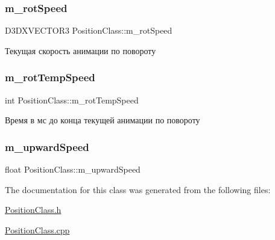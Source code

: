 \subsubsection{\texorpdfstring{m\+\_\+rot\+Speed}{m\_rotSpeed}}
{\footnotesize\ttfamily D3\+D\+X\+V\+E\+C\+T\+O\+R3 Position\+Class\+::m\+\_\+rot\+Speed\hspace{0.3cm}{\ttfamily [private]}}



Текущая скорость анимации по повороту 

\mbox{\label{class_position_class_a2b8254c12435937ad154bf730c7e2e6a}} 
\subsubsection{\texorpdfstring{m\+\_\+rot\+Temp\+Speed}{m\_rotTempSpeed}}
{\footnotesize\ttfamily int Position\+Class\+::m\+\_\+rot\+Temp\+Speed\hspace{0.3cm}{\ttfamily [private]}}



Время в мс до конца текущей анимации по повороту 

\mbox{\label{class_position_class_af0324bb22bef036aff2374066fdd6a3b}} 
\subsubsection{\texorpdfstring{m\+\_\+upward\+Speed}{m\_upwardSpeed}}
{\footnotesize\ttfamily float Position\+Class\+::m\+\_\+upward\+Speed\hspace{0.3cm}{\ttfamily [private]}}



The documentation for this class was generated from the following files\+:\begin{DoxyCompactItemize}
\item 
\hyperlink{_position_class_8h}{Position\+Class.\+h}\item 
\hyperlink{_position_class_8cpp}{Position\+Class.\+cpp}\end{DoxyCompactItemize}

